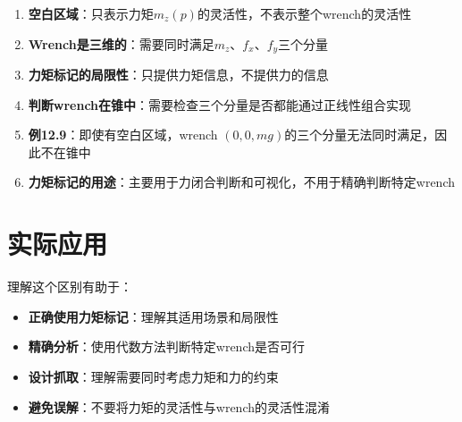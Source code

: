 \documentclass[12pt,a4paper]{article}
\begin{document}
\begin{enumerate}
    \item \textbf{空白区域}：只表示力矩$m_z(p)$的灵活性，不表示整个wrench的灵活性
    
    \item \textbf{Wrench是三维的}：需要同时满足$m_z$、$f_x$、$f_y$三个分量
    
    \item \textbf{力矩标记的局限性}：只提供力矩信息，不提供力的信息
    
    \item \textbf{判断wrench在锥中}：需要检查三个分量是否都能通过正线性组合实现
    
    \item \textbf{例12.9}：即使有空白区域，wrench $(0, 0, mg)$的三个分量无法同时满足，因此不在锥中
    
    \item \textbf{力矩标记的用途}：主要用于力闭合判断和可视化，不用于精确判断特定wrench
\end{enumerate}

\section{实际应用}

理解这个区别有助于：

\begin{itemize}
    \item \textbf{正确使用力矩标记}：理解其适用场景和局限性
    \item \textbf{精确分析}：使用代数方法判断特定wrench是否可行
    \item \textbf{设计抓取}：理解需要同时考虑力矩和力的约束
    \item \textbf{避免误解}：不要将力矩的灵活性与wrench的灵活性混淆
\end{itemize}
\end{document}
